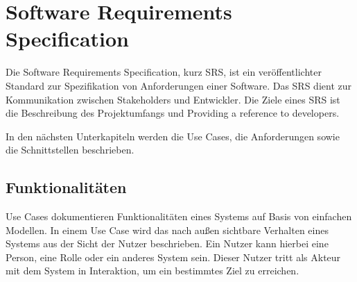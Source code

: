 \chapter{Software Requirements Specification}
	Die Software Requirements Specification, kurz SRS, ist ein veröffentlichter Standard zur Spezifikation von Anforderungen einer Software. Das SRS dient zur Kommunikation zwischen Stakeholders und Entwickler. Die Ziele eines SRS ist die Beschreibung des Projektumfangs und Providing a reference to developers.
	
	In den nächsten Unterkapiteln werden die Use Cases, die Anforderungen sowie die Schnittstellen beschrieben.

\section{Funktionalitäten}
	Use Cases dokumentieren Funktionalitäten eines Systems auf Basis von einfachen Modellen. In einem Use Case wird das nach außen sichtbare Verhalten eines Systems aus der Sicht der Nutzer beschrieben. Ein Nutzer kann hierbei eine Person, eine Rolle oder ein anderes System sein. Dieser Nutzer tritt als Akteur mit dem System in Interaktion, um ein bestimmtes Ziel zu erreichen.
	
